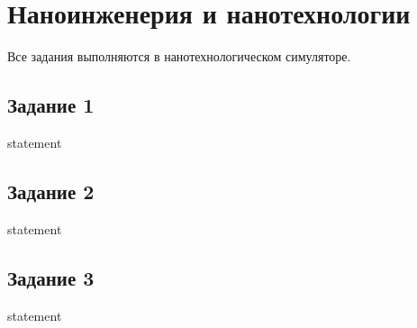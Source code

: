 \chapter{Наноинженерия и нанотехнологии}

Все задания выполняются в нанотехнологическом симуляторе.

\section{Задание 1}

{statement}

\section{Задание 2}

{statement}

\section{Задание 3}

{statement}